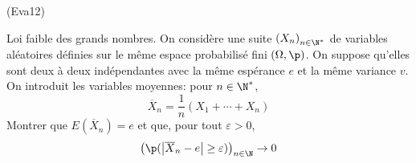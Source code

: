 \begin{tiny}(Eva12)\end{tiny} Loi faible des grands nombres.\newline
On considère une suite $\left( X_n\right) _{n\in \N^*}$ de variables aléatoires définies sur le même espace probabilisé fini $(\Omega, \p)$. On suppose qu'elles sont deux à deux indépendantes avec la même espérance $e$ et la même variance $v$.\newline
On introduit les variables moyennes: pour $n\in \N^*$,
\begin{displaymath}
 \overline{X}_n = \frac{1}{n}(X_1+\cdots+X_n)
\end{displaymath}
Montrer que $E(\overline{X}_n)=e$ et que, pour tout $\varepsilon >0$,
\begin{displaymath}
 \left( \p(\left|\overline{X}_n-e\right|\geq \varepsilon) \right) _{n\in \N} \rightarrow 0
\end{displaymath}
  